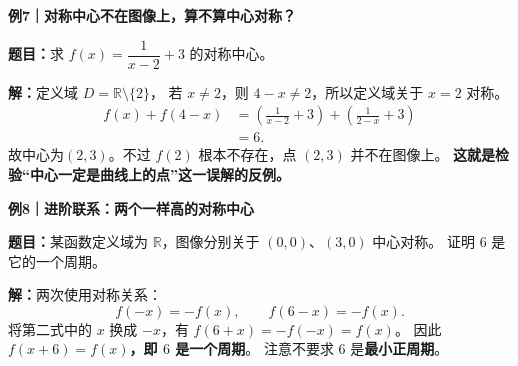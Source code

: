 \clearpage
\begin{examplebox}
\textbf{\textcolor{CExample}{例7｜对称中心不在图像上，算不算中心对称？}}



\textbf{题目：}求 $f(x)=\dfrac1{x-2}+3$ 的对称中心。

\textbf{解：}定义域 $D=\mathbb R\setminus\{2\}$，
若 $x\ne2$，则 $4-x\ne2$，所以定义域关于 $x=2$ 对称。
\[
\begin{aligned}
 f(x)+f(4-x)
 &=\left(\frac1{x-2}+3\right)
   +\left(\frac1{2-x}+3\right)\\
 &=6.
\end{aligned}
\]
故中心为\textbf{$(2,3)$}。不过 $f(2)$ 根本不存在，点 $(2,3)$ 并不在图像上。
\textbf{这就是检验“中心一定是曲线上的点”这一误解的反例。}

\medskip

\end{examplebox}
\clearpage
\begin{examplebox}
\textbf{\textcolor{CExample}{例8｜进阶联系：两个一样高的对称中心}}



\textbf{题目：}某函数定义域为 $\mathbb R$，图像分别关于 $(0,0)$、$(3,0)$ 中心对称。
证明 $6$ 是它的一个周期。

\textbf{解：}两次使用对称关系：
\[
 f(-x)=-f(x),\qquad f(6-x)=-f(x).
\]
将第二式中的 $x$ 换成 $-x$，有
$f(6+x)=-f(-x)=f(x)$。
因此\textbf{$f(x+6)=f(x)$，即 $6$ 是一个周期}。
注意不要求 $6$ 是\textbf{最小正周期}。
\end{examplebox}
